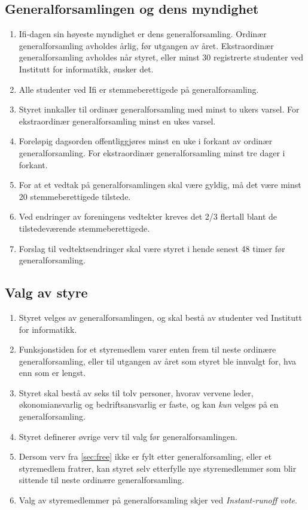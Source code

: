 \documentclass[norsk,a4paper]{article}
\begin{document}
\subsection{Generalforsamlingen og dens myndighet}
\begin{enumerate}
	\item{Ifi-dagen sin høyeste myndighet er dens generalforsamling. Ordinær generalforsamling avholdes årlig, før utgangen av året. Ekstraordinær generalforsamling avholdes når styret, eller minst 30 registrerte studenter ved Institutt for informatikk, ønsker det.}
	\item{Alle studenter ved Ifi er stemmeberettigede på generalforsamling.}
	\item{Styret innkaller til ordinær generalforsamling med minst to ukers varsel. For ekstraordinær generalforsamling minst en ukes varsel.}
	\item{Foreløpig dagsorden offentliggjøres minst en uke i forkant av ordinær generalforsamling. For ekstraordinær generalforsamling minst tre dager i forkant.}
	\item{For at et vedtak på generalforsamlingen skal være gyldig, må det være minst 20 stemmeberettigede tilstede.}
	\item{Ved endringer av foreningens vedtekter kreves det 2/3 flertall blant de tilstedeværende stemmeberettigede.}
	\item{Forslag til vedtektsendringer skal være styret i hende senest 48 timer før generalforsamling.}
\end{enumerate}

\subsection{Valg av styre}
\begin{enumerate}
	\item Styret velges av generalforsamlingen, og skal bestå av studenter ved Institutt for informatikk.
	\item Funksjonstiden for et styremedlem varer enten frem til neste ordinære generalforsamling, eller til utgangen av året som styret ble innvalgt for, hva enn som er lengst.
	\item Styret skal bestå av seks til tolv personer, hvorav vervene leder, økonomiansvarlig og bedriftsansvarlig er faste, og kan \textit{kun} velges på en generalforsamling\label{sec:protected}.
	\item Styret definerer øvrige verv til valg før generalforsamlingen\label{sec:free}.
	\item Dersom verv fra \cref{sec:free} ikke er fylt etter generalforsamling, eller et styremedlem fratrer, kan styret selv etterfylle nye styremedlemmer som blir sittende til neste ordinære generalforsamling.
	\item Valg av styremedlemmer på generalforsamling skjer ved \textit{Instant-runoff vote}\footnotemark.
\end{enumerate}
\end{document}
